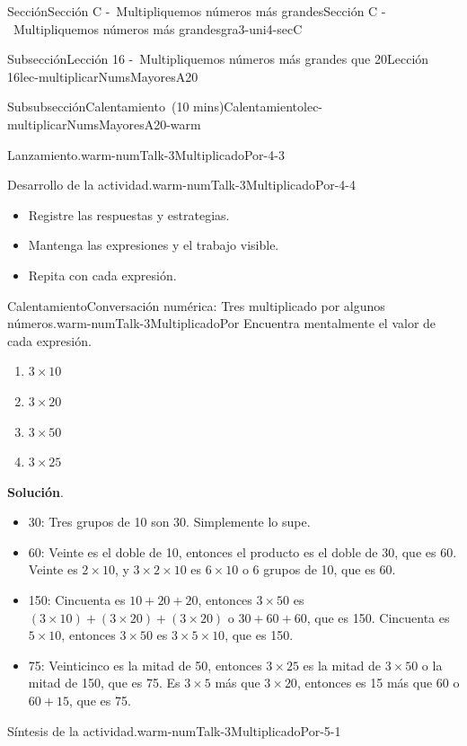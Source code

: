 \documentclass[oneside,10pt,]{article}
\newcommand{\blocktitlefont}{\relax}
\begin{document}
\begin{sectionptx}{Sección}{Sección C -~Multipliquemos números más grandes}{}{Sección C -~Multipliquemos números más grandes}{}{}{gra3-uni4-secC}
\begin{subsectionptx}{Subsección}{Lección 16 -~Multipliquemos números más grandes que 20}{}{Lección 16}{}{}{lec-multiplicarNumsMayoresA20}
\begin{subsubsectionptx}{Subsubsección}{Calentamiento~(10 mins)}{}{Calentamiento}{}{}{lec-multiplicarNumsMayoresA20-warm}
\begin{paragraphs}{Lanzamiento.}{warm-numTalk-3MultiplicadoPor-4-3}
\end{paragraphs}%
\begin{paragraphs}{Desarrollo de la actividad.}{warm-numTalk-3MultiplicadoPor-4-4}%
%
\begin{itemize}[label=\textbullet]
\item{}Registre las respuestas y estrategias.%
\item{}Mantenga las expresiones y el trabajo visible.%
\item{}Repita con cada expresión.%
\end{itemize}
\end{paragraphs}%
\begin{exploration}{Calentamiento}{Conversación numérica: Tres multiplicado por algunos números.}{warm-numTalk-3MultiplicadoPor}%
Encuentra mentalmente el valor de cada expresión.%
%
\begin{enumerate}[label={\Alph*.}]
\item{}\(\displaystyle 3\times 10\)%
\item{}\(\displaystyle 3\times 20\)%
\item{}\(\displaystyle 3\times 50\)%
\item{}\(\displaystyle 3\times 25\)%
\end{enumerate}
\par\smallskip%
\noindent\textbf{\blocktitlefont Solución}.\hypertarget{warm-numTalk-3MultiplicadoPor-3}{}\quad{}%
\begin{itemize}[label=\textbullet]
\item{}30: Tres grupos de 10 son 30. Simplemente lo supe.%
\item{}60: Veinte es el doble de 10, entonces el producto es el doble de 30, que es 60. Veinte es \(2 \times 10\), y \(3 \times 2 \times 10\) es \(6 \times 10\) o 6 grupos de 10, que es 60.%
\item{}150: Cincuenta es \(10 + 20 + 20\), entonces \(3 \times 50\) es \((3 \times 10) + (3 \times 20) + (3 \times 20)\) o \(30 + 60 + 60\), que es 150. Cincuenta es \(5 \times 10\), entonces \(3 \times 50\) es \(3 \times 5 \times 10\), que es 150.%
\item{}75: Veinticinco es la mitad de 50, entonces \(3 \times 25\) es la mitad de \(3 \times 50\) o la mitad de 150, que es 75. Es \(3 \times 5\) más que \(3 \times 20\), entonces es 15 más que 60 o \(60 + 15\), que es 75.%
\end{itemize}
\end{exploration}%
\par
\begin{paragraphs}{Síntesis de la actividad.}{warm-numTalk-3MultiplicadoPor-5-1}%

\end{paragraphs}
\end{subsubsectionptx}
\end{subsectionptx}
\end{sectionptx}
\end{document}
